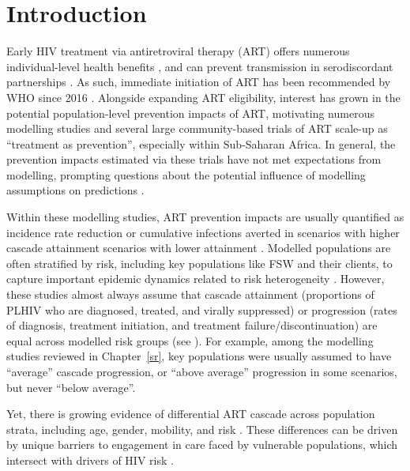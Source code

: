 \section{Introduction}\label{art.intro}
Early HIV treatment via antiretroviral therapy (ART) offers
numerous individual-level health benefits \cite{Gabillard2013,Maartens2014,Danel2015,Lundgren2015},
and can prevent transmission in serodiscordant partnerships \cite{Anglemyer2013,Cohen2016,Rodger2019}.
As such, immediate initiation of ART has been recommended by WHO since 2016 \cite{WHO2016art}.
Alongside expanding ART eligibility,
interest has grown in the potential population-level prevention impacts of ART, motivating
numerous modelling studies \cite{Granich2009,Eaton2012,Eaton2014art,Knight2022sr} and
several large community-based trials \cite{Makhema2019,Havlir2019,Hayes2019,Iwuji2018}
of ART scale-up as ``treatment as prevention'', especially within Sub-Saharan Africa.
In general, the prevention impacts estimated via these trials
have not met expectations from modelling, prompting questions about
the potential influence of modelling assumptions on predictions \cite{Baral2019}.
\par
Within these modelling studies, ART prevention impacts are usually quantified as
incidence rate reduction or cumulative infections averted
in scenarios with higher cascade attainment \vs scenarios with lower attainment \cite{Knight2022sr}.
Modelled populations are often stratified by risk,
including key populations like FSW and their clients,
to capture important epidemic dynamics related to risk heterogeneity
\cite{Stigum1994,Garnett1996,Watts2010}.
However, these studies almost always assume that cascade
attainment (\ie proportions of PLHIV who are diagnosed, treated, and virally suppressed) or
progression (\ie rates of diagnosis, treatment initiation, and treatment failure/discontinuation)
are equal across modelled risk groups (\eg see ).
For example, among the modelling studies reviewed in Chapter~\ref{sr},
key populations were usually assumed to have ``average'' cascade progression,
or ``above average'' progression in some scenarios, but never ``below average''.
\par
Yet, there is growing evidence of differential ART cascade across population strata,
including age, gender, mobility, and risk \cite{Hakim2018,Green2020}.
These differences can be driven by
unique barriers to engagement in care faced by vulnerable populations,
which intersect with drivers of HIV risk \cite{Wanyenze2016,Schwartz2017,Schmidt-Sane2022}.
